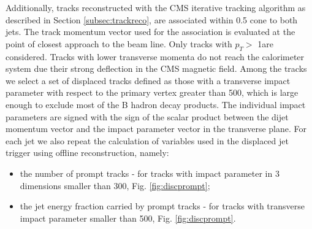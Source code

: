 Additionally, tracks reconstructed with 
the CMS iterative tracking
algorithm \cite{Giordano:2012hr} as described in Section \ref{subsec:trackreco},
 are associated within 0.5 cone to both jets. The track momentum vector used for 
the association is evaluated at the point of closest approach to the beam line. Only tracks
with $p_T>$ 1\GeV are considered. Tracks with lower transverse momenta
do not reach the calorimeter system due their strong deflection in the CMS magnetic field. Among the tracks we select a set of displaced tracks defined as those with
a transverse impact parameter with respect to the primary vertex greater than 500\micron, which is large enough
to exclude most of the B hadron decay products. 
The individual impact parameters are signed with the sign of the scalar product between
 the dijet momentum vector and the impact parameter vector in the transverse plane.
For each jet we also repeat the calculation of variables used in the displaced jet trigger
 using offline reconstruction, namely:

\begin{itemize}
\item the number of prompt tracks - for tracks with impact parameter in 3 dimensions smaller than 300\micron, 
Fig. \ref{fig:discprompt}; 
\item the jet energy fraction carried by prompt tracks - for tracks with transverse impact parameter smaller 
than 500\micron, Fig. \ref{fig:discprompt}.

\end{itemize} 


